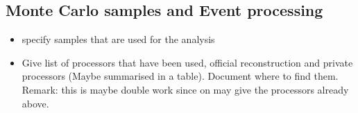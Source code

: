 \documentclass[preprint]{elsarticle}
\begin{document}







\subsection{ Monte Carlo samples and Event processing}
\begin{itemize}
\item specify samples that are used for the analysis
\item Give list of processors that have been used, official reconstruction and private processors (Maybe summarised in a table). Document where to find them. Remark: this is maybe double work since on may give the processors already above.
\end{itemize}
\end{document}
